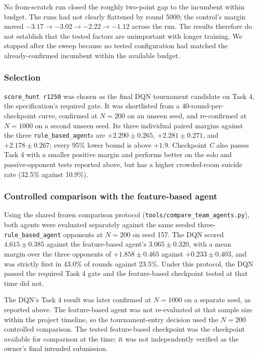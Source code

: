 \documentclass[11pt]{article}
\newcommand{\code}[1]{\texttt{#1}}
\begin{document}
No from-scratch run closed the roughly two-point gap to the incumbent within budget. The
runs had not clearly flattened by round 5000; the control's margin moved
$-3.17 \to -3.02 \to -2.22 \to -1.12$ across the run. The results therefore do not
establish that the tested factors are unimportant with longer training. We stopped after
the sweep because no tested configuration had matched the already-confirmed incumbent
within the available budget.

\subsubsection{Selection}

\code{score\_hunt r1250} was chosen as the final DQN tournament candidate on Task 4, the
specification's required gate. It was shortlisted from a 40-round-per-checkpoint curve,
confirmed at $N{=}200$ on an unseen seed, and re-confirmed at $N{=}1000$ on a second unseen
seed. Its three individual paired margins against the three
\code{rule\_based\_agent}s are $+2.290 \pm 0.265$, $+2.281 \pm 0.271$, and
$+2.178 \pm 0.267$; every 95\% lower bound is above $+1.9$. Checkpoint \emph{C} also
passes Task 4 with a smaller positive margin and performs better on the solo and
passive-opponent tests reported above, but has a higher crowded-room suicide rate
(32.5\% against 10.9\%).

\subsubsection{Controlled comparison with the feature-based agent}

Using the shared frozen comparison protocol (\code{tools/compare\_team\_agents.py}), both
agents were evaluated separately against the same seeded three-\code{rule\_based\_agent}
opponents at $N{=}200$ on seed 157. The DQN scored $4.615 \pm 0.385$ against the
feature-based agent's $3.065 \pm 0.320$, with a mean margin over the three opponents of
$+1.858 \pm 0.465$ against $+0.233 \pm 0.403$, and was strictly first in 43.0\% of rounds
against 23.5\%. Under this protocol, the DQN passed the required Task 4 gate and the
feature-based checkpoint tested at that time did not.

The DQN's Task 4 result was later confirmed at $N{=}1000$ on a separate seed, as reported
above. The feature-based agent was not re-evaluated at that sample size within the project
timeline, so the tournament-entry decision used the $N{=}200$ controlled comparison. The
tested feature-based checkpoint was the checkpoint available for comparison at the time;
it was not independently verified as the owner's final intended submission.
\end{document}
